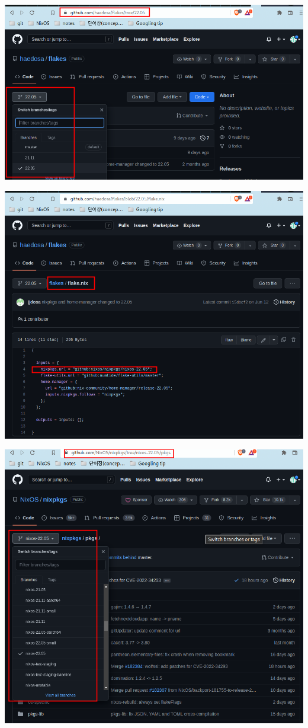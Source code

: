 \documentclass[11pt]{article}
\begin{document}
\begin{center}
\includegraphics[width=.9\linewidth]{./img/3_nix/real repo flake indicate.png}
\end{center}
\begin{center}
\includegraphics[width=.9\linewidth]{./img/3_nix/real repo flake indicate_2.png}
\end{center}
\begin{center}
\includegraphics[width=.9\linewidth]{./img/3_nix/real repo flake indicate_3.png}
\end{center}
\end{document}
